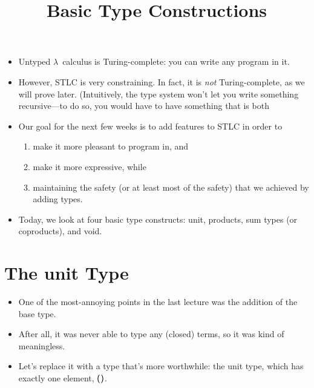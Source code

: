 \documentclass{lecturenotes}
\title{Basic Type Constructions}
\newcommand{\abs}[2]{\ensuremath{\lambda #1.\,#2}}
\newcommand{\utype}{\textsf{unit}\xspace}
\newcommand{\unit}{\ensuremath{\textsf{(}\mkern0.5mu\textsf{)}}}
\begin{document}
\maketitle

\begin{itemize}
\item Untyped $\lambda$~calculus is Turing-complete: you can write any program in it.
\item However, STLC is very constraining.
  In fact, it is \emph{not} Turing-complete, as we will prove later.
  (Intuitively, the type system won't let you write something recursive---to do so, you would have to have something that is both 
\item Our goal for the next few weeks is to add features to STLC in order to
  \begin{enumerate}[(1)]
  \item make it more pleasant to program in, and
  \item make it more expressive, while
  \item maintaining the safety (or at least most of the safety) that we achieved by adding types.
  \end{enumerate}
\item Today, we look at four basic type constructs: \utype, products, sum types (or coproducts), and \textsf{void}.
\end{itemize}

\section{The \utype Type}
\label{sec:unit-type}

\begin{itemize}
\item One of the most-annoying points in the last lecture was the addition of the base type.
\item After all, it was never able to type any (closed) terms, so it was kind of meaningless.
\item Let's replace it with a type that's more worthwhile: the \utype type, which has exactly one element, $\unit$.
\end{itemize}

\begin{syntax}
  \category[Types]{\tau} \alternative{\ldots} \alternative{\utype}
   \alternative{\ldots} \alternative{\unit}
   \alternative{\abs{x}{e}} \alternative{\unit}
\end{syntax}
\end{document}

